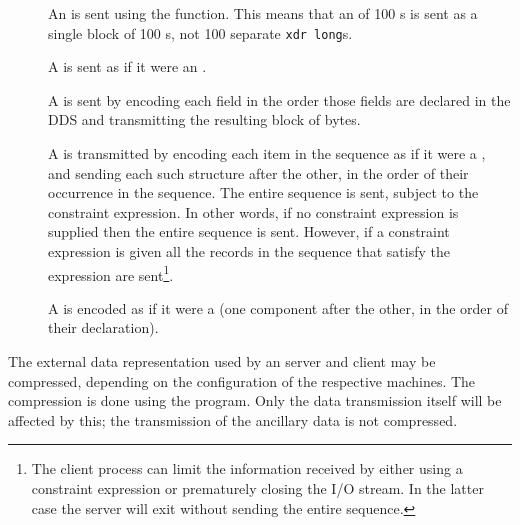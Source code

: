\begin{description}
  
\item [] An  is sent using the
   function. This means that an  of 100
  s is sent as a single block of 100 s, not
  100 separate {\tt xdr long}s.
  
\item [] A  is sent as if it were an
  .
  
\item [] A  is sent by encoding each
  field in the order those fields are declared in the DDS and
  transmitting the resulting block of bytes.
  
\item [] A  is transmitted by encoding
  each item in the sequence as if it were a , and
  sending each such structure after the other, in the order of their
  occurrence in the sequence. The entire sequence is sent, subject to
  the constraint expression. In other words, if no constraint
  expression is supplied then the entire sequence is sent. However, if
  a constraint expression is given all the records in the sequence
  that satisfy the expression are sent\footnote{The client process can
    limit the information received by either using a constraint
    expression or prematurely closing the I/O stream. In the latter
    case the server will exit without sending the entire sequence.}.


  
\item [] A  is encoded as if it were a
   (one component after the other, in the order of
  their declaration).

\end{description}

The external data representation used by an \opendap server and client may
be compressed, depending on the configuration of the respective
machines.  The compression is done using the  program.
Only the data transmission itself will be affected by this; the
transmission of the ancillary data is not compressed.
 

